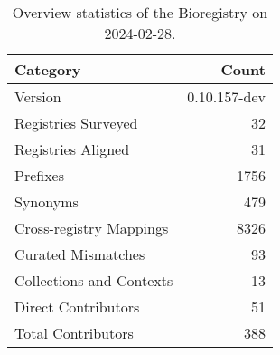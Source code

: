 \begin{table}
\caption{Overview statistics of the Bioregistry on 2024-02-28.}
\label{tab:bioregistry-summary}
\begin{tabular}{lr}
\toprule
Category & Count \\
\midrule
Version & 0.10.157-dev \\
Registries Surveyed & 32 \\
Registries Aligned & 31 \\
Prefixes & 1756 \\
Synonyms & 479 \\
Cross-registry Mappings & 8326 \\
Curated Mismatches & 93 \\
Collections and Contexts & 13 \\
Direct Contributors & 51 \\
Total Contributors & 388 \\
\bottomrule
\end{tabular}
\end{table}

